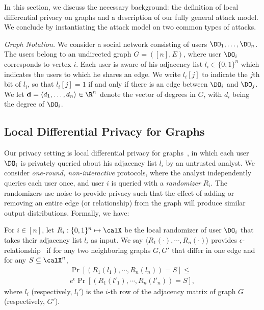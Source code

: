 In this section, we discuss the necessary background: the definition of local differential privacy on graphs and a description of our fully general attack model. We conclude by instantiating the attack model on two common types of attacks.

\textit{Graph Notation.}
We consider a social network consisting of users $\DO_1, \ldots, \DO_n$. The users belong to an undirected graph $G = ([n], E)$, where user $\DO_i$ corresponds to vertex $i$. Each user is aware of his adjacency list $l_i \in \{0,1\}^n$ which indicates the users to which he shares an edge. We write $l_i[j]$ to indicate the $j$th bit of $l_i$, so that $l_i[j]=1$ if and only if there is an edge between $\DO_i$ and $\DO_j$. We let $\textbf{d}=\langle d_1, \ldots, d_n\rangle \in \R^n$ denote the vector of degrees in $G$, with $d_i$ being the degree of $\DO_i$.

\subsection{Local Differential Privacy for Graphs}\label{chap4-sec:ldp}

Our privacy setting is local differential privacy for graphs~\cite{imola2021locally}, in which each user $\DO_i$ is privately queried about his adjacency list $l_i$ by an untrusted analyst. We consider \emph{one-round, non-interactive} protocols, where the analyst independently queries each user once, and user $i$ is queried with a \emph{randomizer} $R_i$. The randomizers use noise to provide privacy such that the effect of adding or removing an entire edge (or relationship) from the graph will produce similar output distributions. Formally, we have:

\begin{defn}  For $i \in [n]$,
let $R_i: \{0,1\}^n\mapsto \calX$ be the local randomizer of user $\DO_i$ that takes their adjacency list $l_i$ as input.
We say $\langle R_1(\cdot),\cdots,R_n(\cdot)\rangle$ provides $\epsilon$-relationship \DP~if for any
two neighboring graphs $G,G'$ that differ in one edge and
for any $S\subseteq \calX^n$,
\begin{gather*}
\Pr[(R_1(l_1),\cdots,R_n(l_n)) = S]
\leq \\e^{\epsilon} \Pr[(R_1(l'_1),\cdots,R_n(l'_n))=S], \end{gather*}
where $l_i$ (respectively, $l_i'$)
is the $i$-th row of the adjacency
matrix of graph $G$ (respectively, $G'$).\end{defn}

